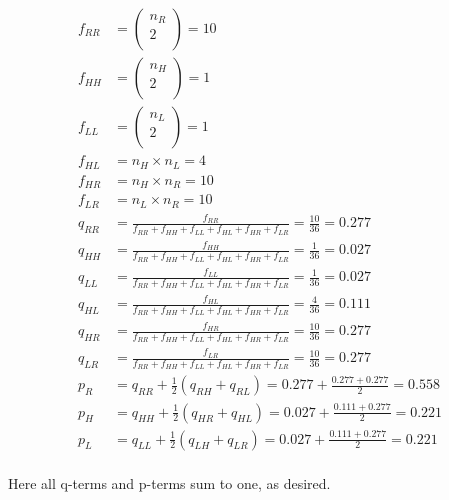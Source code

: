 \documentclass[10pt]{article} %
\begin{document}
\begin{align*}
  f_{RR} &= \begin{pmatrix} n_R\\ 2\\ \end{pmatrix} = 10\\
  f_{HH} &= \begin{pmatrix} n_H\\ 2\\ \end{pmatrix} = 1\\
  f_{LL} &= \begin{pmatrix} n_L\\ 2\\ \end{pmatrix} = 1\\
  f_{HL} &= n_H \times n_L = 4\\
  f_{HR} &= n_H \times n_R = 10\\
  f_{LR} &= n_L \times n_R = 10\\
  q_{RR} &= \frac{f_{RR}}{f_{RR} + f_{HH} + f_{LL} + f_{HL} + f_{HR} + f_{LR}}
  = \frac{10}{36} = 0.277\\
  q_{HH} &= \frac{f_{HH}}{f_{RR} + f_{HH} + f_{LL} + f_{HL} + f_{HR} + f_{LR}}
  = \frac{1}{36} = 0.027\\
  q_{LL} &= \frac{f_{LL}}{f_{RR} + f_{HH} + f_{LL} + f_{HL} + f_{HR} + f_{LR}}
  = \frac{1}{36} = 0.027\\
  q_{HL} &= \frac{f_{HL}}{f_{RR} + f_{HH} + f_{LL} + f_{HL} + f_{HR} + f_{LR}}
  = \frac{4}{36} = 0.111\\
  q_{HR} &= \frac{f_{HR}}{f_{RR} + f_{HH} + f_{LL} + f_{HL} + f_{HR} + f_{LR}}
  = \frac{10}{36} = 0.277\\
  q_{LR} &= \frac{f_{LR}}{f_{RR} + f_{HH} + f_{LL} + f_{HL} + f_{HR} + f_{LR}}
  = \frac{10}{36} = 0.277\\
  p_R &= q_{RR} + \frac{1}{2}\left(q_{RH} + q_{RL}\right) = 0.277 +
  \frac{0.277 + 0.277}{2} = 0.558\\
  p_H &= q_{HH} + \frac{1}{2}\left(q_{HR} + q_{HL}\right) = 0.027 +
  \frac{0.111 + 0.277}{2} = 0.221\\
  p_L &= q_{LL} + \frac{1}{2}\left(q_{LH} + q_{LR}\right) = 0.027 +
  \frac{0.111 + 0.277}{2} = 0.221\\
\end{align*}

Here all q-terms and p-terms sum to one, as desired.
\end{document}
